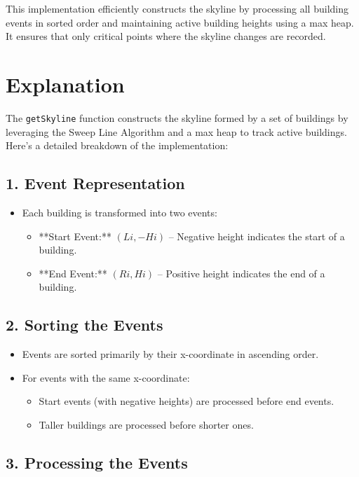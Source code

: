 This implementation efficiently constructs the skyline by processing all building events in sorted order and maintaining active building heights using a max heap. It ensures that only critical points where the skyline changes are recorded.

\section*{Explanation}

The \texttt{getSkyline} function constructs the skyline formed by a set of buildings by leveraging the Sweep Line Algorithm and a max heap to track active buildings. Here's a detailed breakdown of the implementation:

\subsection*{1. Event Representation}

\begin{itemize}
    \item Each building is transformed into two events:
    \begin{itemize}
        \item **Start Event:** \((Li, -Hi)\) – Negative height indicates the start of a building.
        \item **End Event:** \((Ri, Hi)\) – Positive height indicates the end of a building.
    \end{itemize}
\end{itemize}

\subsection*{2. Sorting the Events}

\begin{itemize}
    \item Events are sorted primarily by their x-coordinate in ascending order.
    \item For events with the same x-coordinate:
    \begin{itemize}
        \item Start events (with negative heights) are processed before end events.
        \item Taller buildings are processed before shorter ones.
    \end{itemize}
\end{itemize}

\subsection*{3. Processing the Events}

